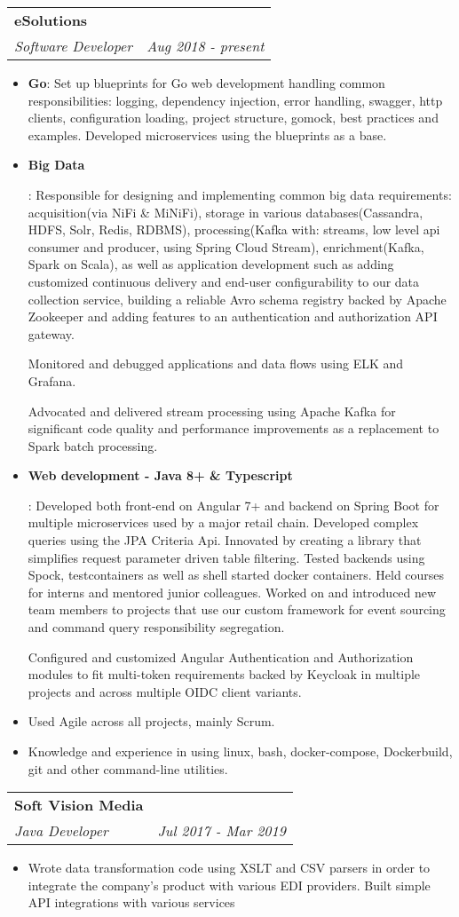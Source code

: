 \documentclass[letterpaper,11pt]{article}
\makeatletter
\newcommand{\resumeItem}[2]{
  \item\small{
    \textbf{#1}{: #2 \vspace{-2pt}}
  }
}
\newcommand{\simpleResumeItem}[1]{
  \item\small{
  #1
  }
}
\newcommand{\resumeSubheading}[4]{
  \vspace{-1pt}\item
    \begin{tabular*}{0.97\textwidth}[t]{l@{\extracolsep{\fill}}r}
      \textbf{#1} & #2 \\
      \textit{\small#3} & \textit{\small #4} \\
    \end{tabular*}\vspace{-5pt}
}
\newcommand{\resumeItemListStart}{\begin{itemize}}
\newcommand{\resumeItemListEnd}{\end{itemize}\vspace{-5pt}}
\makeatother
\begin{document}
    \resumeSubheading
      {eSolutions}{}
      {Software Developer}{Aug 2018 - present}
      \resumeItemListStart
	\resumeItem{Go}{
	  Set up blueprints for Go web development handling common responsibilities: logging, dependency injection, error handling, swagger, http clients, configuration loading, project structure, gomock, best practices and examples. Developed microservices using the blueprints as a base.
	}
        \resumeItem{Big Data}{
          Responsible for designing and implementing common big data requirements: acquisition(via NiFi \& MiNiFi), storage in various databases(Cassandra, HDFS, Solr, Redis, RDBMS), processing(Kafka with: streams, low level api consumer and producer, using Spring Cloud Stream), enrichment(Kafka, Spark on Scala), as well as application development such as adding customized continuous delivery and end-user configurability to our data collection service, building a reliable Avro schema registry backed by Apache Zookeeper and adding features to an authentication and authorization API gateway.
          
          Monitored and debugged applications and data flows using ELK and Grafana.
          
          Advocated and delivered stream processing using Apache Kafka for significant code quality and performance improvements as a replacement to Spark batch processing.}
        \resumeItem{Web development - Java 8+ & Typescript}{
	  Developed both front-end on Angular 7+ and backend on Spring Boot for multiple microservices used by a major retail chain. Developed complex queries using the JPA Criteria Api. Innovated by creating a library that simplifies request parameter driven table filtering. Tested backends using Spock, testcontainers as well as shell started docker containers. Held courses for interns and mentored junior colleagues. Worked on and introduced new team members to projects that use our custom framework for event sourcing and command query responsibility segregation.  

	  Configured and customized Angular Authentication and Authorization modules to fit multi-token requirements backed by Keycloak in multiple projects and across multiple OIDC client variants.
}

       	\simpleResumeItem{}{
	Used Agile across all projects, mainly Scrum.
	}
	\simpleResumeItem{}{
	Knowledge and experience in using linux, bash, docker-compose, Dockerbuild, git and other command-line utilities. 
	}
      \resumeItemListEnd
    \resumeSubheading
      {Soft Vision Media}{}
      {Java Developer}{Jul 2017 - Mar 2019}
      \resumeItemListStart
        \simpleResumeItem{
          Wrote data transformation code using XSLT and CSV parsers in order to integrate the company's product with various EDI providers. Built simple API integrations with various services}
      \resumeItemListEnd
\end{document}
